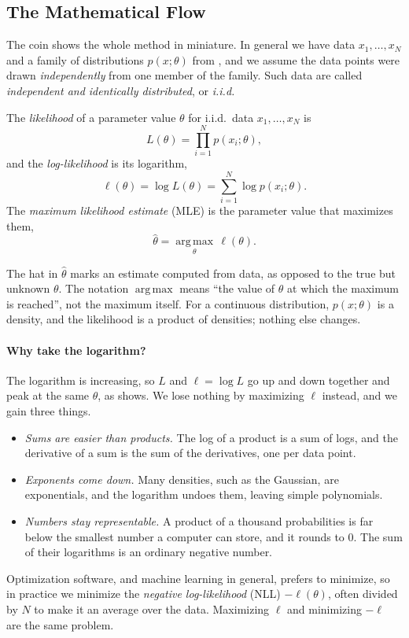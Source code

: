 \subsection{The Mathematical Flow}
\label{sec:ch06-mle-flow}

The coin shows the whole method in miniature. In general we have data
$x_1, \dots, x_N$ and a family of distributions $p(x; \theta)$ from
, and we assume the data points were drawn
\emph{independently} from one member of the family. Such data are called
\emph{independent and identically distributed}, or \emph{i.i.d.}

\begin{definition}
  \label{def:mle}
  The \emph{likelihood} of a parameter value $\theta$ for i.i.d.\ data
  $x_1, \dots, x_N$ is
  \[
    L(\theta) = \prod_{i=1}^{N} p(x_i; \theta) ,
  \]
  and the \emph{log-likelihood} is its logarithm,
  \[
    \ell(\theta) = \log L(\theta) = \sum_{i=1}^{N} \log p(x_i; \theta) .
  \]
  The \emph{maximum likelihood estimate} (MLE) is the parameter value
  that maximizes them,
  \[
    \hat\theta = \operatorname*{arg\,max}_{\theta}\, \ell(\theta) .
  \]
\end{definition}

The hat in $\hat\theta$ marks an estimate computed from data, as opposed
to the true but unknown $\theta$. The notation $\operatorname*{arg\,max}$
means ``the value of $\theta$ at which the maximum is reached'', not
the maximum itself. For a continuous distribution, $p(x; \theta)$ is a
density, and the likelihood is a product of densities; nothing else
changes.

\paragraph{Why take the logarithm?}
The logarithm is increasing, so $L$ and $\ell = \log L$ go up and down
together and peak at the same $\theta$, as 
shows. We lose nothing by maximizing $\ell$ instead, and we gain three
things.
\begin{itemize}
  \item \emph{Sums are easier than products.} The log of a product is a
    sum of logs, and the derivative of a sum is the sum of the
    derivatives, one per data point.
  \item \emph{Exponents come down.} Many densities, such as the
    Gaussian, are exponentials, and the logarithm undoes them, leaving
    simple polynomials.
  \item \emph{Numbers stay representable.} A product of a thousand
    probabilities is far below the smallest number a computer can store,
    and it rounds to $0$. The sum of their logarithms is an ordinary
    negative number.
\end{itemize}
Optimization software, and machine learning in general, prefers to
minimize, so in practice we minimize the \emph{negative log-likelihood}
(NLL) $-\ell(\theta)$, often divided by $N$ to make it an average over the
data. Maximizing $\ell$ and minimizing $-\ell$ are the same problem.

